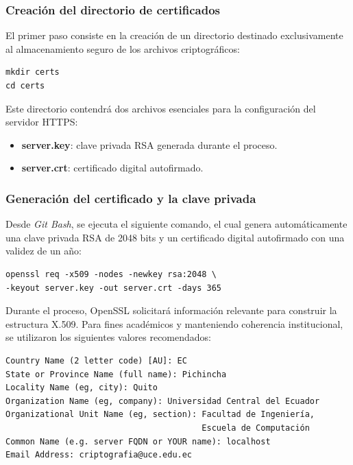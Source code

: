 \subsubsection{Creación del directorio de certificados}

El primer paso consiste en la creación de un directorio destinado exclusivamente al almacenamiento seguro de los archivos criptográficos:

\begin{verbatim}
mkdir certs
cd certs
\end{verbatim}

Este directorio contendrá dos archivos esenciales para la configuración del servidor HTTPS:

\begin{itemize}
    \item \textbf{server.key}: clave privada RSA generada durante el proceso.
    \item \textbf{server.crt}: certificado digital autofirmado.
\end{itemize}

\subsubsection{Generación del certificado y la clave privada}

Desde \textit{Git Bash}, se ejecuta el siguiente comando, el cual genera automáticamente una clave privada RSA de 2048 bits y un certificado digital autofirmado con una validez de un año:

\begin{verbatim}
openssl req -x509 -nodes -newkey rsa:2048 \
-keyout server.key -out server.crt -days 365
\end{verbatim}

Durante el proceso, OpenSSL solicitará información relevante para construir la estructura X.509. Para fines académicos y manteniendo coherencia institucional, se utilizaron los siguientes valores recomendados:

\begin{verbatim}
Country Name (2 letter code) [AU]: EC
State or Province Name (full name): Pichincha
Locality Name (eg, city): Quito
Organization Name (eg, company): Universidad Central del Ecuador
Organizational Unit Name (eg, section): Facultad de Ingeniería,
                                        Escuela de Computación
Common Name (e.g. server FQDN or YOUR name): localhost
Email Address: criptografia@uce.edu.ec
\end{verbatim}

